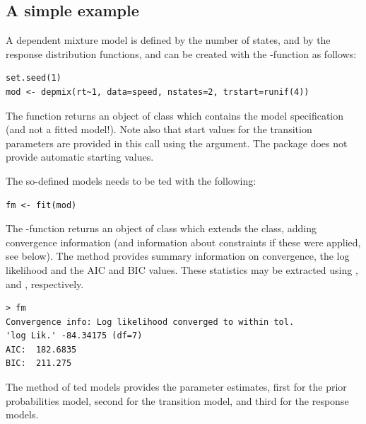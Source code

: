 \documentclass[article]{jss}
\begin{document}
\subsection{A simple example}

A dependent mixture model is defined by the number of states, and by
the response distribution functions, and can be created with the
-function as follows:

\begin{verbatim} 
set.seed(1)
mod <- depmix(rt~1, data=speed, nstates=2, trstart=runif(4))
\end{verbatim}
The  function returns an object of class 
which contains the model specification (and not a fitted model!).
Note also that start values for the transition parameters are provided
in this call using the  argument. The package does not 
provide automatic starting values. 

The so-defined models needs to be ted with the following: 
\begin{verbatim}
fm <- fit(mod)
\end{verbatim}

The -function returns an object of class
 which extends the  class, adding
convergence information (and information about constraints if these
were applied, see below).  The  method provides summary
information on convergence, the log likelihood and the AIC and BIC
values.  These statistics may be extracted using ,
 and , respectively.

\begin{verbatim}
> fm 
Convergence info: Log likelihood converged to within tol. 
'log Lik.' -84.34175 (df=7)
AIC:  182.6835 
BIC:  211.275 
\end{verbatim}

The  method of ted models provides the parameter
estimates, first for the prior probabilities model, second for the
transition model, and third for the response models.
\end{document}
